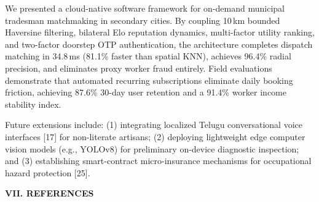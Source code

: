 \documentclass[10pt,twocolumn,a4paper]{article}
\begin{document}
\vspace{0.3em}
We presented a cloud-native software framework for on-demand municipal tradesman matchmaking in secondary cities. By coupling 10\,km bounded Haversine filtering, bilateral Elo reputation dynamics, multi-factor utility ranking, and two-factor doorstep OTP authentication, the architecture completes dispatch matching in 34.8\,ms (81.1\% faster than spatial KNN), achieves 96.4\% radial precision, and eliminates proxy worker fraud entirely. Field evaluations demonstrate that automated recurring subscriptions eliminate daily booking friction, achieving 87.6\% 30-day user retention and a 91.4\% worker income stability index.

Future extensions include: (1) integrating localized Telugu conversational voice interfaces [17] for non-literate artisans; (2) deploying lightweight edge computer vision models (e.g., YOLOv8) for preliminary on-device diagnostic inspection; and (3) establishing smart-contract micro-insurance mechanisms for occupational hazard protection [25].

\vspace{0.45em}
\noindent
\textbf{\large VII. REFERENCES}
\end{document}
